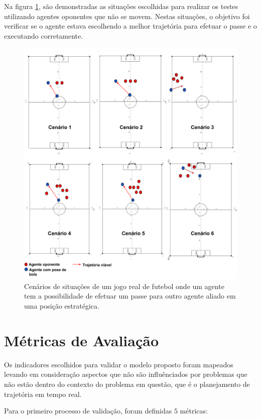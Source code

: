 Na figura \ref{fig:cenario}, são demonstradas as situações escolhidas para realizar os testes utilizando agentes oponentes que não se movem. 
Nestas situações, o objetivo foi verificar se o agente estava escolhendo a melhor trajetória para efetuar o passe e o 
executando corretamente.

\begin{figure}[!htb]
\centering
{}
\includegraphics[scale=0.3]{figuras/Cenario.png}
\caption{Cenários de situações de um jogo real de futebol onde um agente tem a possibilidade de efetuar um passe para outro agente 
aliado em uma posição estratégica.} 
\label{fig:cenario}
\end{figure}
\FloatBarrier

\section{Métricas de Avaliação}
\label{sec:metricas}
Os indicadores escolhidos para validar o modelo proposto foram mapeados levando em consideração aspectos que não são 
influênciados por problemas que não estão dentro do contexto do problema em questão, que é o planejamento de trajetória em tempo 
real.

Para o primeiro processo de validação, foram definidas $5$ métricas:

